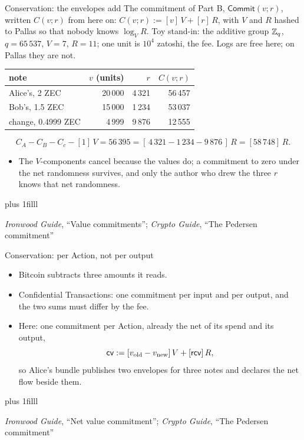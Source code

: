 \documentclass[aspectratio=169,11pt]{beamer}
\newcommand{\cvsym}{\ensuremath{\mathsf{cv}}}
\newcommand{\rcv}{\ensuremath{\mathsf{rcv}}}
\newcommand{\Comm}{\ensuremath{\mathsf{Commit}}}
\newcommand{\src}[1]{\par\vskip0pt plus 1filll
  {\fontsize{6}{7.2}\selectfont\color{arbdim}\raggedright #1\par}}
\begin{document}
\begin{frame}{Conservation: the envelopes add}
The commitment of Part B, $\Comm(v; r)$, written $C(v; r)$ from here
on: $C(v; r) := [v]\,V + [r]\,R$, with $V$ and $R$ hashed to Pallas so
that nobody knows $\log_V R$. Toy stand-in: the additive group $\mathbb{Z}_q$,
$q = 65\,537$, $V = 7$, $R = 11$; one unit is $10^4$ zatoshi, the fee.
Logs are free here; on Pallas they are not.
\begin{center}\small
\begin{tabular}{@{}lrrr@{}}
\toprule
note & $v$ (units) & $r$ & $C(v; r)$ \\
\midrule
Alice's, 2 ZEC & 20\,000 & 4\,321 & 56\,457 \\
Bob's, 1.5 ZEC & 15\,000 & 1\,234 & 53\,037 \\
change, 0.4999 ZEC & 4\,999 & 9\,876 & 12\,555 \\
\bottomrule
\end{tabular}
\end{center}
\vspace{-4pt}
\[
C_A - C_B - C_c - [1]\,V = 56\,395
= [\,4\,321 - 1\,234 - 9\,876\,]\,R = [58\,748]\,R .
\]
\vspace{-8pt}
\begin{itemize}
\item The $V$-components cancel because the values do; a commitment
  to zero under the net randomness survives, and only the author who
  drew the three $r$ knows that net randomness.
\end{itemize}
\src{\emph{Ironwood Guide}, ``Value commitments''; \emph{Crypto Guide}, ``The
Pedersen commitment''}
\end{frame}

\begin{frame}{Conservation: per Action, not per output}
\begin{itemize}
\item Bitcoin subtracts three amounts it reads.
\item Confidential Transactions: one commitment per input and per
  output, and the two sums must differ by the fee.
\item Here: one commitment per Action, already the net of its spend and
  its output,
  \[
  \cvsym := [\Epvold - \Epvnew]\,V + [\rcv]\,R ,
  \]
  so Alice's bundle publishes two envelopes for three notes and declares
  the net flow \Epvbal{} beside them.
\end{itemize}
\src{\emph{Ironwood Guide}, ``Net value commitment''; \emph{Crypto Guide}, ``The
Pedersen commitment''}
\end{frame}
\end{document}
